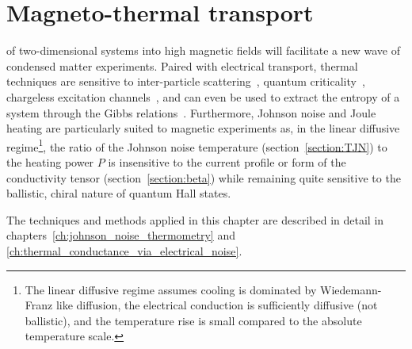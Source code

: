 

\chapter{Magneto-thermal transport}
\label{ch:magneto-thermal_transport}
 of two-dimensional systems into high magnetic fields will facilitate a new wave of condensed matter experiments. Paired with electrical transport, thermal techniques are sensitive to inter-particle scattering~\cite{muller_collective_2008, crossno_observation_2016, lucas_transport_2016}, quantum criticality~\cite{sachdev_quantum_2011, muller_quantum-critical_2008}, chargeless excitation channels~\cite{wakeham_gross_2011, kane_thermal_1996, li_ballistic_2005, mccollum_spin-wave_1964, bid_observation_2010, inoue_proliferation_2014, venkatachalam_local_2012}, and can even be used to extract the entropy of a system through the Gibbs relations~\cite{kuntsevich_strongly_2015}. Furthermore, Johnson noise and Joule heating are particularly suited to magnetic experiments as, in the linear diffusive regime\footnote{The linear diffusive regime assumes cooling is dominated by Wiedemann-Franz like diffusion, the electrical conduction is sufficiently diffusive (not ballistic), and the temperature rise is small compared to the absolute temperature scale.}, the ratio of the Johnson noise temperature (section~\ref{section:TJN}) to the heating power $P$ is insensitive to the current profile or form of the conductivity tensor (section~\ref{section:beta}) while remaining quite sensitive to the ballistic, chiral nature of quantum Hall states.

The techniques and methods applied in this chapter are described in detail in chapters~\ref{ch:johnson_noise_thermometry} and \ref{ch:thermal_conductance_via_electrical_noise}.

